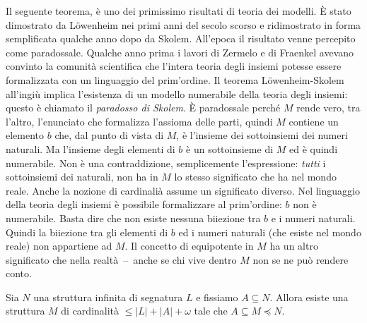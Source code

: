 Il seguente teorema, \`e uno dei primissimo risultati di teoria dei modelli. \`E stato dimostrato da L\"owenheim nei primi anni del secolo scorso e ridimostrato in forma semplificata qualche anno dopo da Skolem.  All'epoca il risultato venne percepito come paradossale. Qualche anno prima i lavori di Zermelo e di Fraenkel avevano convinto la comunit\`a scientifica che l'intera teoria degli insiemi potesse essere formalizzata con un linguaggio del prim'ordine. Il teorema  L\"owenheim-Skolem all'ingi\`u implica l'esistenza di un modello numerabile della teoria degli insiemi: questo \`e chiamato il \emph{paradosso di Skolem}. \`E paradossale perch\'e $M$ rende vero, tra l'altro, l'enunciato che formalizza l'assioma delle parti, quindi $M$ contiene un elemento $b$ che, dal punto di vista di $M$, \`e l'insieme dei sottoinsiemi dei numeri naturali. Ma l'insieme degli elementi di $b$ \`e un sottoinsieme di $M$ ed \`e quindi numerabile. Non \`e una contraddizione, semplicemente l'espressione: \textit{tutti\/} i sottoinsiemi dei naturali, non ha in $M$ lo stesso significato che ha nel mondo reale. Anche la nozione di cardinali\`a assume un significato diverso. Nel linguaggio della teoria degli insiemi \`e possibile formalizzare al prim'ordine: $b$ non \`e numerabile. Basta dire che non esiste nessuna biiezione tra $b$ e i numeri naturali. Quindi la biiezione tra gli elementi di $b$ ed i numeri naturali (che esiste nel mondo reale) non appartiene ad $M$. Il concetto di equipotente in $M$ ha un altro significato che nella realt\`a~--~anche se chi vive dentro $M$ non se ne pu\`o rendere conto.

\begin{theorem}\label{lowenheimskolemallingiu}
Sia $N$ una struttura infinita di segnatura $L$ e fissiamo $A\subseteq N$. Allora esiste una struttura $M$ di cardinalit\`a $\le|L|+|A|+\omega$ tale che $A\subseteq M\preceq N$. 
\end{theorem}

